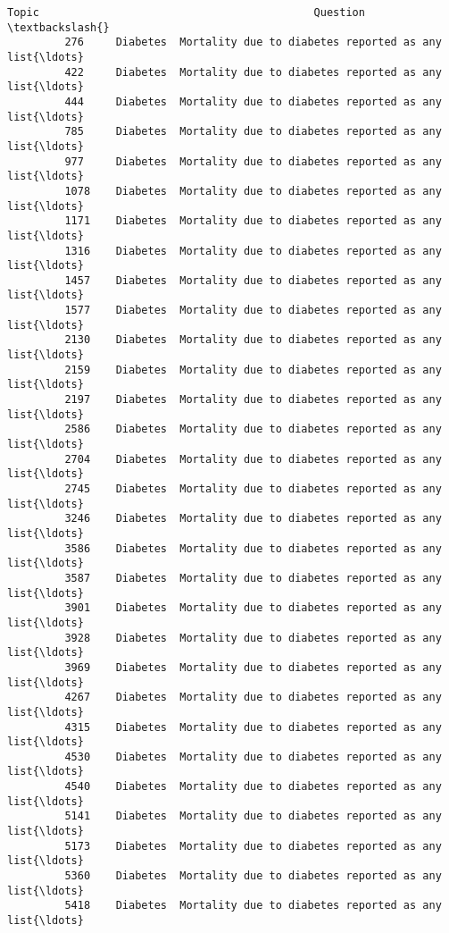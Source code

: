 \documentclass[11pt]{article}
\begin{document}
\begin{Verbatim}[commandchars=\\\{\}]
                    Topic                                           Question  \textbackslash{}
         276     Diabetes  Mortality due to diabetes reported as any list{\ldots}   
         422     Diabetes  Mortality due to diabetes reported as any list{\ldots}   
         444     Diabetes  Mortality due to diabetes reported as any list{\ldots}   
         785     Diabetes  Mortality due to diabetes reported as any list{\ldots}   
         977     Diabetes  Mortality due to diabetes reported as any list{\ldots}   
         1078    Diabetes  Mortality due to diabetes reported as any list{\ldots}   
         1171    Diabetes  Mortality due to diabetes reported as any list{\ldots}   
         1316    Diabetes  Mortality due to diabetes reported as any list{\ldots}   
         1457    Diabetes  Mortality due to diabetes reported as any list{\ldots}   
         1577    Diabetes  Mortality due to diabetes reported as any list{\ldots}   
         2130    Diabetes  Mortality due to diabetes reported as any list{\ldots}   
         2159    Diabetes  Mortality due to diabetes reported as any list{\ldots}   
         2197    Diabetes  Mortality due to diabetes reported as any list{\ldots}   
         2586    Diabetes  Mortality due to diabetes reported as any list{\ldots}   
         2704    Diabetes  Mortality due to diabetes reported as any list{\ldots}   
         2745    Diabetes  Mortality due to diabetes reported as any list{\ldots}   
         3246    Diabetes  Mortality due to diabetes reported as any list{\ldots}   
         3586    Diabetes  Mortality due to diabetes reported as any list{\ldots}   
         3587    Diabetes  Mortality due to diabetes reported as any list{\ldots}   
         3901    Diabetes  Mortality due to diabetes reported as any list{\ldots}   
         3928    Diabetes  Mortality due to diabetes reported as any list{\ldots}   
         3969    Diabetes  Mortality due to diabetes reported as any list{\ldots}   
         4267    Diabetes  Mortality due to diabetes reported as any list{\ldots}   
         4315    Diabetes  Mortality due to diabetes reported as any list{\ldots}   
         4530    Diabetes  Mortality due to diabetes reported as any list{\ldots}   
         4540    Diabetes  Mortality due to diabetes reported as any list{\ldots}   
         5141    Diabetes  Mortality due to diabetes reported as any list{\ldots}   
         5173    Diabetes  Mortality due to diabetes reported as any list{\ldots}   
         5360    Diabetes  Mortality due to diabetes reported as any list{\ldots}   
         5418    Diabetes  Mortality due to diabetes reported as any list{\ldots}   

\end{Verbatim}
\end{document}
